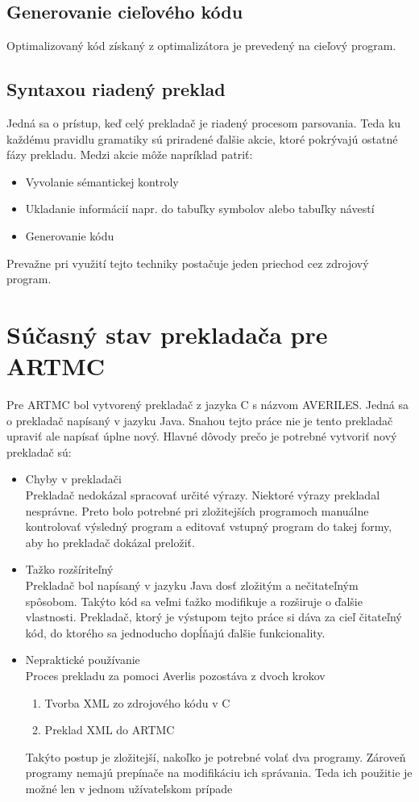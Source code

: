 \section{Generovanie cieľového kódu}
Optimalizovaný kód získaný z optimalizátora je prevedený na cieľový program.

\section{Syntaxou riadený preklad}
\label{sec_synta}
Jedná sa o prístup, keď celý prekladač je riadený procesom parsovania. Teda ku každému pravidlu gramatiky sú priradené ďalšie akcie, ktoré pokrývajú ostatné fázy prekladu. Medzi akcie môže napríklad patriť:
\begin{itemize}
    \item Vyvolanie sémantickej kontroly
    \item Ukladanie informácií napr. do tabuľky symbolov alebo tabuľky návestí
    \item Generovanie kódu
\end{itemize}
Prevažne pri využití tejto techniky postačuje jeden priechod cez zdrojový program.


\chapter{Súčasný stav prekladača pre ARTMC}
\label{kap_averiles}
Pre ARTMC bol vytvorený prekladač z jazyka C s názvom AVERILES. Jedná sa o
prekladač napísaný v jazyku Java. Snahou tejto práce nie je tento prekladač
upraviť ale napísať úplne nový. Hlavné dôvody prečo je potrebné vytvoriť nový
prekladač sú:
\begin{itemize}
    \item Chyby v prekladači\\
        Prekladač nedokázal spracovať určité výrazy. Niektoré výrazy prekladal nesprávne.
        Preto bolo potrebné pri zložitejších programoch manuálne kontrolovať výsledný
        program a editovať vstupný program do takej formy, aby ho prekladač dokázal
        preložiť.
    \item Tažko rozšíriteľný\\
        Prekladač bol napísaný v jazyku Java dosť zložitým a nečitateľným spôsobom. Takýto
        kód sa veľmi ťažko modifikuje a rozširuje o ďalšie vlastnosti. Prekladač,
        ktorý je výstupom tejto práce si dáva za cieľ čitateľný kód, do ktorého
        sa jednoducho dopĺňajú ďalšie funkcionality.
    \item Nepraktické používanie\\
        Proces prekladu za pomoci Averlis pozostáva z dvoch krokov
        \begin{enumerate}
            \item Tvorba XML zo zdrojového kódu v C
            \item Preklad XML do ARTMC
        \end{enumerate}
        Takýto postup je zložitejší, nakoľko je potrebné volať dva programy.
        Zároveň programy nemajú prepínače na modifikáciu ich správania. Teda
        ich použitie je možné len v jednom užívateľskom prípade
\end{itemize}

